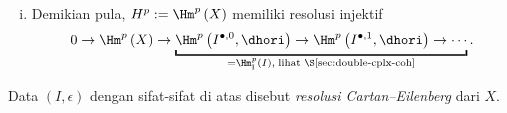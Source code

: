 \begin{teorema}
\begin{enumerate}[(i)]
		\[ 0 \to \Image\left( d_X^p \right) \to \Image\left( \dhori^{p, 0} \right) \to \Image\left( \dhori^{p, 1} \right) \to \cdots . \]
		\item Demikian pula, $H^p := \Hm^p\left(X\right)$ memiliki resolusi injektif
		\[ 0 \to \Hm^p\left(X\right) \to \underbracket{\Hm^p\left( I^{\bullet, 0}, \dhori \right) \to \Hm^p\left( I^{\bullet, 1}, \dhori \right) \to \cdots}_{= \Hm^p_{\mathrm{I}}\left( I \right), \;\text{lihat \S\ref{sec:double-cplx-coh}} } . \]
	\end{enumerate}
	Data $(I, \epsilon)$ dengan sifat-sifat di atas disebut \emph{resolusi Cartan--Eilenberg} dari $X$.
\end{teorema}
